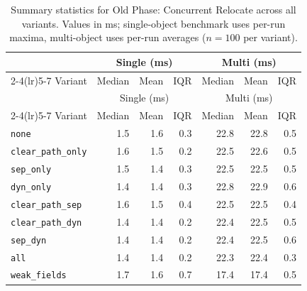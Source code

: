 \begin{longtable}[c]{l rrr rrr}
\caption[Old Phase: Concurrent Relocate summary statistics]{Summary statistics for Old Phase: Concurrent Relocate across all variants. Values in ms; single-object benchmark uses per-run maxima, multi-object uses per-run averages ($n=100$ per variant).}\label{tab:stats-old-relocate} \\
\toprule
 & \multicolumn{3}{c}{Single (ms)} & \multicolumn{3}{c}{Multi (ms)} \\
\cmidrule(lr){2-4}\cmidrule(lr){5-7}
Variant & Median & Mean & IQR & Median & Mean & IQR \\
\midrule
\endfirsthead
\toprule
 & \multicolumn{3}{c}{Single (ms)} & \multicolumn{3}{c}{Multi (ms)} \\
\cmidrule(lr){2-4}\cmidrule(lr){5-7}
Variant & Median & Mean & IQR & Median & Mean & IQR \\
\midrule
\endhead
\bottomrule
\endfoot
\texttt{none} & 1.5 & 1.6 & 0.3 & 22.8 & 22.8 & 0.5 \\
\texttt{clear\_path\_only} & 1.6 & 1.5 & 0.2 & 22.5 & 22.6 & 0.5 \\
\texttt{sep\_only} & 1.5 & 1.4 & 0.3 & 22.5 & 22.5 & 0.5 \\
\texttt{dyn\_only} & 1.4 & 1.4 & 0.3 & 22.8 & 22.9 & 0.6 \\
\texttt{clear\_path\_sep} & 1.6 & 1.5 & 0.4 & 22.5 & 22.5 & 0.4 \\
\texttt{clear\_path\_dyn} & 1.4 & 1.4 & 0.2 & 22.4 & 22.5 & 0.5 \\
\texttt{sep\_dyn} & 1.4 & 1.4 & 0.2 & 22.4 & 22.5 & 0.6 \\
\texttt{all} & 1.4 & 1.4 & 0.2 & 22.3 & 22.4 & 0.3 \\
\texttt{weak\_fields} & 1.7 & 1.6 & 0.7 & 17.4 & 17.4 & 0.5 \\
\end{longtable}
